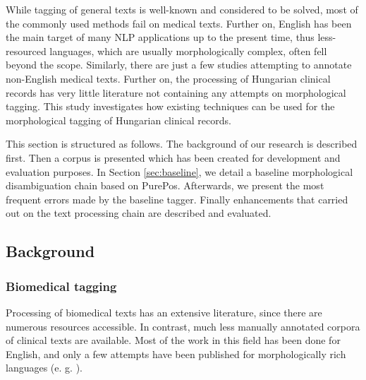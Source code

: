 While tagging of general texts is well-known and considered to be solved, most of the commonly used methods fail on medical texts. Further on, English has been the main target of many NLP applications up to the present time, thus less-resourced languages, which are usually morphologically complex, often fell beyond the scope. Similarly, there are just a few studies attempting to annotate non-English medical texts. Further on, the processing of Hungarian clinical records has very little literature not containing any attempts on morphological tagging. This study investigates how existing techniques can be used for the morphological tagging of Hungarian clinical records.

This section is structured as follows. The background of our research is described first. Then a corpus is presented which has been created for development and evaluation purposes. In Section \ref{sec:baseline}, we detail a baseline morphological disambiguation chain based on PurePos. Afterwards, we present the most frequent errors made by the baseline tagger. Finally enhancements that carried out on the text processing chain are described and evaluated.  

\subsection{Background}

\subsubsection{Biomedical tagging}\label{sec:biomed_tag}

Processing of biomedical texts has an extensive literature, since there are numerous resources accessible. In contrast, much less manually annotated corpora of clinical texts are available. Most of the work in this field has been done for English, and  only a few attempts have been published for morphologically rich languages (e. g. \cite{oleynik2009performance,rost2008lessons}).

